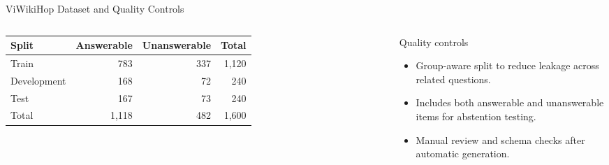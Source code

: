 \documentclass[aspectratio=169]{beamer}
\begin{document}
\begin{frame}[shrink=4]{ViWikiHop Dataset and Quality Controls}
\small
\begin{columns}[T]
\begin{tabular}{lrrr}
\toprule
Split & Answerable & Unanswerable & Total \\
\midrule
Train & 783 & 337 & 1,120 \\
Development & 168 & 72 & 240 \\
Test & 167 & 73 & 240 \\
\midrule
Total & 1,118 & 482 & 1,600 \\
\bottomrule
\end{tabular}
\begin{block}{Quality controls}
\begin{itemize}
\item Group-aware split to reduce leakage across related questions.
\item Includes both answerable and unanswerable items for abstention testing.
\item Manual review and schema checks after automatic generation.
\end{itemize}
\end{block}
\end{columns}
\end{frame}
\end{document}
